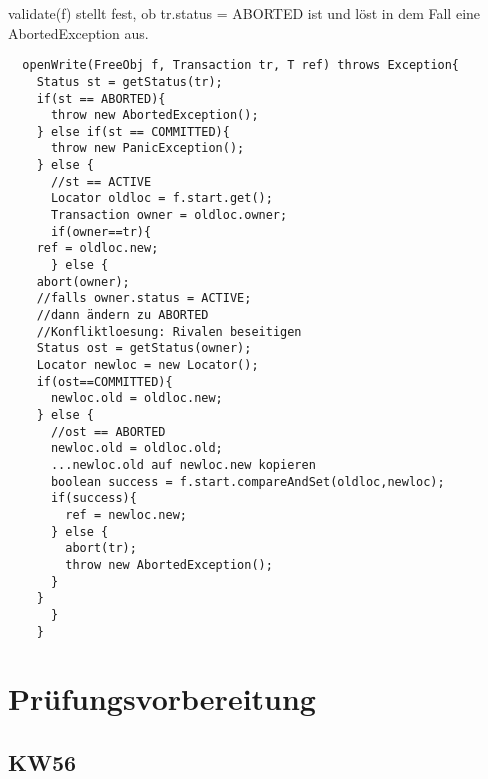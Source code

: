 \documentclass[a4paper,12pt]{scrartcl}
\begin{document}
 validate(f) stellt fest, ob tr.status = ABORTED ist und löst in dem Fall eine AbortedException aus.\\

 \begin{lstlisting}
  openWrite(FreeObj f, Transaction tr, T ref) throws Exception{
    Status st = getStatus(tr);
    if(st == ABORTED){
      throw new AbortedException();
    } else if(st == COMMITTED){
      throw new PanicException();
    } else {
      //st == ACTIVE
      Locator oldloc = f.start.get();
      Transaction owner = oldloc.owner;
      if(owner==tr){
	ref = oldloc.new;
      } else {
	abort(owner);
	//falls owner.status = ACTIVE;
	//dann ändern zu ABORTED
	//Konfliktloesung: Rivalen beseitigen
	Status ost = getStatus(owner);
	Locator newloc = new Locator();
	if(ost==COMMITTED){
	  newloc.old = oldloc.new;
	} else {
	  //ost == ABORTED
	  newloc.old = oldloc.old;
	  ...newloc.old auf newloc.new kopieren
	  boolean success = f.start.compareAndSet(oldloc,newloc);
	  if(success){
	    ref = newloc.new;
	  } else {
	    abort(tr);
	    throw new AbortedException();
	  }
	}
      }
    }
 \end{lstlisting}


\section{Prüfungsvorbereitung}

\subsection{KW56}
\end{document}
